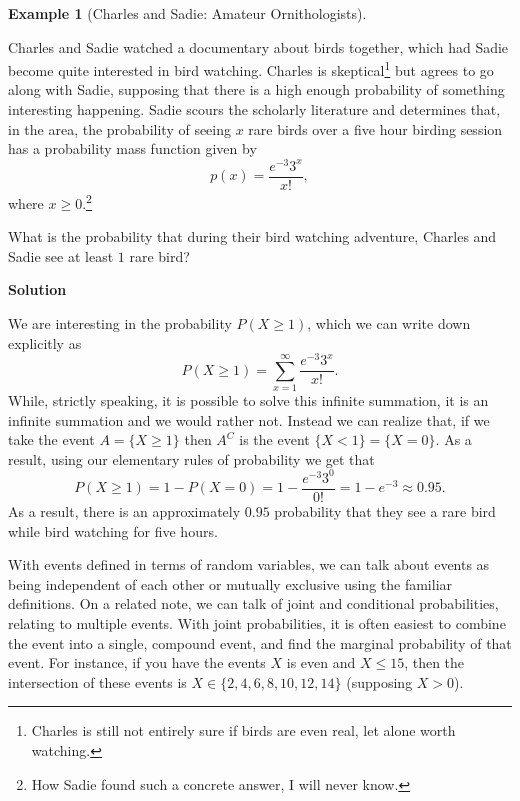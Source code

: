 \documentclass[
  letterpaper,
  DIV=11,
  numbers=noendperiod]{scrreprt}
\theoremstyle{definition}
\theoremstyle{definition}
\theoremstyle{definition}
\newtheorem{example}{Example}[chapter]
\theoremstyle{remark}
\begin{document}
\begin{example}[Charles and Sadie: Amateur
Ornithologists]\protect\hypertarget{exm-probability-calc}{}\label{exm-probability-calc}

Charles and Sadie watched a documentary about birds together, which had
Sadie become quite interested in bird watching. Charles is
skeptical\footnote{Charles is still not entirely sure if birds are even
  real, let alone worth watching.} but agrees to go along with Sadie,
supposing that there is a high enough probability of something
interesting happening. Sadie scours the scholarly literature and
determines that, in the area, the probability of seeing \(x\) rare birds
over a five hour birding session has a probability mass function given
by \[p(x) = \frac{e^{-3}3^x}{x!},\] where \(x\geq 0\).\footnote{How
  Sadie found such a concrete answer, I will never know.}

What is the probability that during their bird watching adventure,
Charles and Sadie see at least \(1\) rare bird?

\begin{tcolorbox}[enhanced jigsaw, colback=white, breakable, rightrule=.15mm, leftrule=.75mm, toprule=.15mm, left=2mm, arc=.35mm, opacityback=0, bottomrule=.15mm]

\vspace{-3mm}\textbf{Solution}\vspace{3mm}

We are interesting in the probability \(P(X \geq 1)\), which we can
write down explicitly as
\[P(X \geq 1) = \sum_{x=1}^\infty \frac{e^{-3}3^x}{x!}.\] While,
strictly speaking, it is possible to solve this infinite summation, it
is an infinite summation and we would rather not. Instead we can realize
that, if we take the event \(A = \{X \geq 1\}\) then \(A^C\) is the
event \(\{X < 1\} = \{X = 0\}\). As a result, using our elementary rules
of probability we get that
\[P(X \geq 1) = 1 - P(X = 0) = 1 - \frac{e^{-3}3^{0}}{0!} = 1 - e^{-3} \approx 0.95.\]
As a result, there is an approximately \(0.95\) probability that they
see a rare bird while bird watching for five hours.

\end{tcolorbox}

\end{example}

With events defined in terms of random variables, we can talk about
events as being independent of each other or mutually exclusive using
the familiar definitions. On a related note, we can talk of joint and
conditional probabilities, relating to multiple events. With joint
probabilities, it is often easiest to combine the event into a single,
compound event, and find the marginal probability of that event. For
instance, if you have the events \(X\) is even and \(X \leq 15\), then
the intersection of these events is \(X \in \{2,4,6,8,10,12,14\}\)
(supposing \(X > 0\)).
\end{document}
